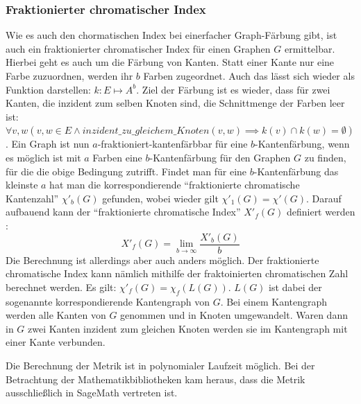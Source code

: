 \documentclass[a4paper,12pt,ngerman,chapterprefix=false,listof=totoc,bibliography=totoc]{scrreprt}
\begin{document}
\subsubsection*{Fraktionierter chromatischer Index}
{
Wie es auch den chormatischen Index bei einerfacher Graph-Färbung gibt, ist auch ein fraktionierter chromatischer Index für einen Graphen \(G\) ermittelbar. Hierbei geht es auch um die Färbung von Kanten. Statt einer Kante nur eine Farbe zuzuordnen, werden ihr \(b\) Farben zugeordnet. Auch das lässt sich wieder als Funktion darstellen: \(k:E\mapsto A^b\). Ziel der Färbung ist es wieder, dass für zwei Kanten, die inzident zum selben Knoten sind, die Schnittmenge der Farben leer ist: \(\forall v,w(v,w\in E\land inzident\_zu\_gleichem\_Knoten(v,w)\implies k(v)\cap k(w)=\emptyset)\). Ein Graph ist nun \(a\)-fraktioniert-kantenfärbbar für eine \(b\)-Kantenfärbung, wenn es möglich ist mit \(a\) Farben eine \(b\)-Kantenfärbung für den Graphen \(G\) zu finden, für die die obige Bedingung zutrifft. Findet man für eine \(b\)-Kantenfärbung das kleinste \(a\) hat man die korrespondierende "`fraktionierte chromatische Kantenzahl"' \(\chi'_b(G)\) gefunden, wobei wieder gilt \(\chi'_1(G)=\chi'(G)\). Darauf aufbauend kann der "`fraktionierte chromatische Index"' \(X'_f(G)\) definiert werden \cite{weisstein_fractional_nodate-1,scheinerman_fractional_2011}:
\[
	X'_f(G)=\lim_{b\to\infty}\frac{X'_b(G)}{b}
\]
Die Berechnung ist allerdings aber auch anders möglich. Der fraktionierte chromatische Index kann nämlich mithilfe der fraktoinierten chromatischen Zahl berechnet werden. Es gilt: \(\chi'_f(G)=\chi_f(L(G))\). \(L(G)\) ist dabei der sogenannte korrespondierende Kantengraph von \(G\). Bei einem Kantengraph werden alle Kanten von \(G\) genommen und in Knoten umgewandelt. Waren dann in \(G\) zwei Kanten inzident zum gleichen Knoten werden sie im Kantengraph mit einer Kante verbunden.

Die Berechnung der Metrik ist in polynomialer Laufzeit möglich. Bei der Betrachtung der Mathematikbibliotheken kam heraus, dass die Metrik ausschließlich in SageMath vertreten ist. \cite{sagemath_graph_2020}
}
\end{document}
